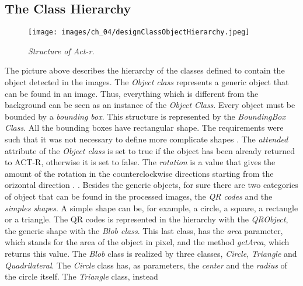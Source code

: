   \subsection{The Class Hierarchy}
  \begin{figure}[h]
	  \begin{center} 
	    \texttt{[image: images/ch\_04/designClassObjectHierarchy.jpeg]}
	  \end{center} 
	  \caption{\textit{Structure of Act-r.}}  
	  \label{fig:modulesActr}
  \end{figure}
  The picture above describes the hierarchy of the classes defined to contain the object detected in the images. The \textit{Object class} represents a generic object that can be found in an image. Thus, everything which is different from the background can be seen as an instance of the \textit{Object Class}. Every object must be bounded by a \textit{bounding box}. This structure is represented by the \textit{BoundingBox Class}. All the bounding boxes have rectangular shape. The requirements were such that it was not necessary to define more complicate shapes . The \textit{attended} attribute of the \textit{Object class} is set to true if the object has been already returned to ACT-R, otherwise it is set to false. The \textit{rotation} is a value that gives the amount of the rotation in the counterclockwise directions starting from the orizontal direction . .
  Besides the generic objects, for sure there are two categories of object that can be found in the processed images, the \textit{QR codes} and the \textit{simples shapes}. A simple shape can be, for example, a circle, a square, a rectangle or a triangle. The QR codes is represented in the hierarchy with the \textit{QRObject}, the generic shape with the \textit{Blob class}.
  This last class, has the \textit{area} parameter, which stands for the area of the object in pixel, and the method \textit{getArea}, which returns this value. The \textit{Blob} class is realized by three classes, \textit{Circle}, \textit{Triangle} and \textit{Quadrilateral}. 
  The \textit{Circle} class has, as parameters, the \textit{center} and the \textit{radius} of the circle itself.
  The \textit{Triangle} class, instead 

  
  
  
  
  